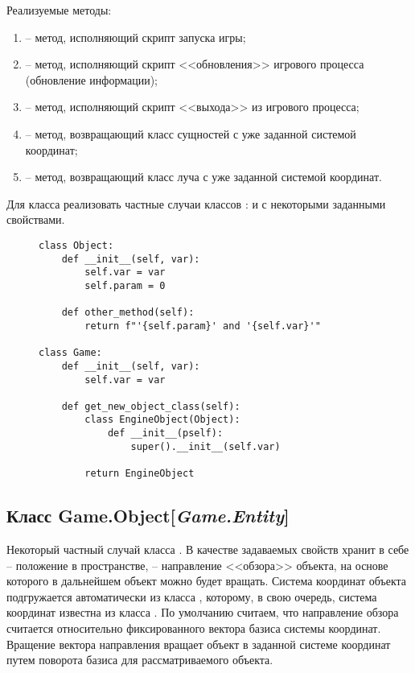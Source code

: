 	\noindent Реализуемые методы:
	\begin{enumerate}
		\item {} -- метод, исполняющий скрипт запуска игры;
		\item {} -- метод, исполняющий скрипт <<обновления>> игрового процесса (обновление информации);
		\item {} -- метод, исполняющий скрипт <<выхода>> из игрового процесса;
		\item {} -- метод, возвращающий класс сущностей с уже заданной системой координат;
		\item {} -- метод, возвращающий класс луча с уже заданной системой координат.
	\end{enumerate}

Для класса  реализовать частные случаи классов :  и  с некоторыми заданными свойствами.

\begin{figure}[H]
	\begin{lstlisting}[caption=Пример кода реализации создания класса со значением по умолчанию]
class Object:
	def __init__(self, var):
		self.var = var
		self.param = 0

	def other_method(self):
		return f"'{self.param}' and '{self.var}'"

class Game:
	def __init__(self, var):
		self.var = var

	def get_new_object_class(self):
		class EngineObject(Object):
			def __init__(pself):
				super().__init__(self.var)

		return EngineObject
	\end{lstlisting}
\end{figure}

\subsection{Класс Game.Object[\textit{Game.Entity}]}
	\noindent Некоторый частный случай класса . В качестве задаваемых свойств хранит в себе  -- положение в пространстве,  -- направление <<обзора>> объекта, на основе которого в дальнейшем объект можно будет вращать. Система координат объекта подгружается автоматически из класса , которому, в свою очередь, система координат известна из класса . По умолчанию считаем, что направление обзора считается относительно фиксированного вектора базиса системы координат. Вращение вектора направления вращает объект в заданной системе координат путем поворота базиса для рассматриваемого объекта.


